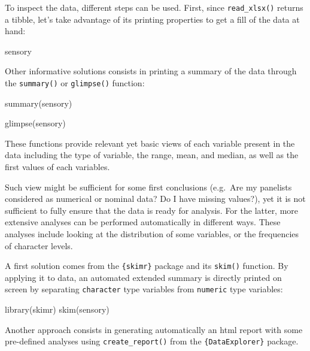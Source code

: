 \documentclass[
]{book}
\newenvironment{Shaded}{\begin{snugshade}}{\end{snugshade}}
\newcommand{\FunctionTok}[1]{\textcolor[rgb]{0.00,0.00,0.00}{#1}}
\newcommand{\NormalTok}[1]{#1}
\begin{document}
To inspect the data, different steps can be used.
First, since \texttt{read\_xlsx()} returns a tibble, let's take advantage of its printing properties to get a fill of the data at hand:

\begin{Shaded}
\begin{Highlighting}[]
\NormalTok{sensory}
\end{Highlighting}
\end{Shaded}

Other informative solutions consists in printing a summary of the data through the \texttt{summary()} or \texttt{glimpse()} function:

\begin{Shaded}
\begin{Highlighting}[]
\FunctionTok{summary}\NormalTok{(sensory)}

\FunctionTok{glimpse}\NormalTok{(sensory)}
\end{Highlighting}
\end{Shaded}

These functions provide relevant yet basic views of each variable present in the data including the type of variable, the range, mean, and median, as well as the first values of each variables.

Such view might be sufficient for some first conclusions (e.g.~Are my panelists considered as numerical or nominal data? Do I have missing values?), yet it is not sufficient to fully ensure that the data is ready for analysis. For the latter, more extensive analyses can be performed automatically in different ways. These analyses include looking at the distribution of some variables, or the frequencies of character levels.

A first solution comes from the \texttt{\{skimr\}} package and its \texttt{skim()} function. By applying it to data, an automated extended summary is directly printed on screen by separating \texttt{character} type variables from \texttt{numeric} type variables:

\begin{Shaded}
\begin{Highlighting}[]
\FunctionTok{library}\NormalTok{(skimr)}
\FunctionTok{skim}\NormalTok{(sensory)}
\end{Highlighting}
\end{Shaded}

Another approach consists in generating automatically an html report with some pre-defined analyses using \texttt{create\_report()} from the \texttt{\{DataExplorer\}} package.
\end{document}
